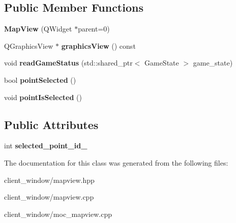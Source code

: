 \subsection*{Public Member Functions}
\begin{DoxyCompactItemize}
\item 
{\bfseries Map\+View} (Q\+Widget $\ast$parent=0)\hypertarget{classMapView_a4dbedd735235252920e1ce4265768d31}{}\label{classMapView_a4dbedd735235252920e1ce4265768d31}

\item 
Q\+Graphics\+View $\ast$ {\bfseries graphics\+View} () const \hypertarget{classMapView_aad89785cc6217fb112498e893f18d34e}{}\label{classMapView_aad89785cc6217fb112498e893f18d34e}

\item 
void {\bfseries read\+Game\+Status} (std\+::shared\+\_\+ptr$<$ Game\+State $>$ game\+\_\+state)\hypertarget{classMapView_a71f8f8e460fbb2593bf931402f64b315}{}\label{classMapView_a71f8f8e460fbb2593bf931402f64b315}

\item 
bool {\bfseries point\+Selected} ()\hypertarget{classMapView_a08a0bc12af9ed3be5634f310a547436c}{}\label{classMapView_a08a0bc12af9ed3be5634f310a547436c}

\item 
void {\bfseries point\+Is\+Selected} ()\hypertarget{classMapView_a31c953eb544594fca9beb7c713d1fff6}{}\label{classMapView_a31c953eb544594fca9beb7c713d1fff6}

\end{DoxyCompactItemize}
\subsection*{Public Attributes}
\begin{DoxyCompactItemize}
\item 
int {\bfseries selected\+\_\+point\+\_\+id\+\_\+}\hypertarget{classMapView_ab981b6988372e64566774db5cc70df04}{}\label{classMapView_ab981b6988372e64566774db5cc70df04}

\end{DoxyCompactItemize}


The documentation for this class was generated from the following files\+:\begin{DoxyCompactItemize}
\item 
client\+\_\+window/mapview.\+hpp\item 
client\+\_\+window/mapview.\+cpp\item 
client\+\_\+window/moc\+\_\+mapview.\+cpp\end{DoxyCompactItemize}
